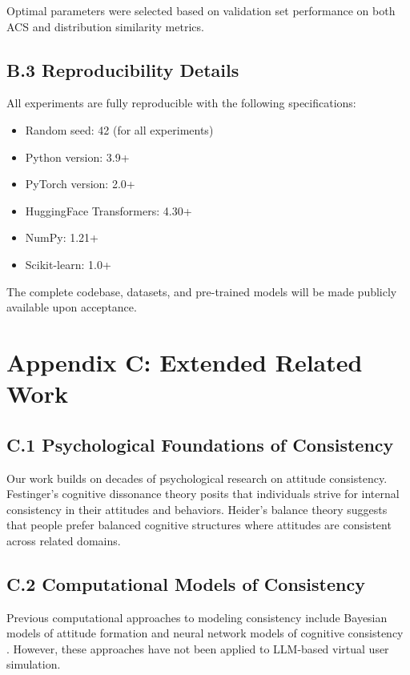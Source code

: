 \documentclass[sigconf, anonymous]{acmart}
\begin{document}
Optimal parameters were selected based on validation set performance on both ACS and distribution similarity metrics.

\subsection*{B.3 Reproducibility Details}

All experiments are fully reproducible with the following specifications:

\begin{itemize}
    \item Random seed: 42 (for all experiments)
    \item Python version: 3.9+
    \item PyTorch version: 2.0+
    \item HuggingFace Transformers: 4.30+
    \item NumPy: 1.21+
    \item Scikit-learn: 1.0+
\end{itemize}

The complete codebase, datasets, and pre-trained models will be made publicly available upon acceptance.

\newpage
\section*{Appendix C: Extended Related Work}

\subsection*{C.1 Psychological Foundations of Consistency}

Our work builds on decades of psychological research on attitude consistency. Festinger's cognitive dissonance theory \cite{festinger1957theory} posits that individuals strive for internal consistency in their attitudes and behaviors. Heider's balance theory \cite{heider1958psychology} suggests that people prefer balanced cognitive structures where attitudes are consistent across related domains.

\subsection*{C.2 Computational Models of Consistency}

Previous computational approaches to modeling consistency include Bayesian models of attitude formation \cite{rozenblit2001biases} and neural network models of cognitive consistency \cite{read1997neural}. However, these approaches have not been applied to LLM-based virtual user simulation.
\end{document}
